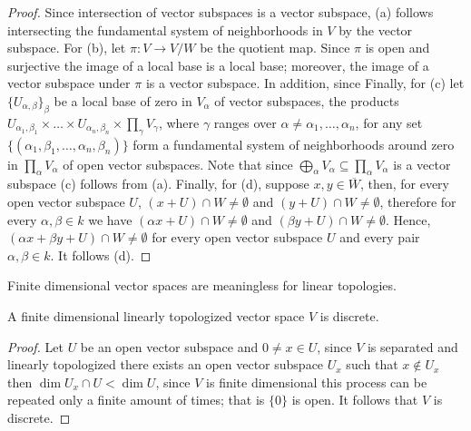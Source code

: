 \begin{proof}
	Since intersection of vector subspaces is a vector subspace, (a) follows intersecting the fundamental system of neighborhoods in $V$ by the vector subspace. For (b), let $\pi\colon V \to V/W$ be the quotient map. Since $\pi$ is open and surjective the image of a local base is a local base; moreover, the image of a vector subspace under $\pi$ is a vector subspace. In addition, since  Finally, for (c) let $\{U_{\alpha, \beta}\}_{\beta}$ be a local base of zero in $V_{\alpha}$ of vector subspaces, the products $U_{\alpha_{1}, \beta_{1}} \times \ldots \times U_{\alpha_{n}, \beta_{n}} \times \prod_{\gamma} V_{\gamma}$, where $\gamma$ ranges over $\alpha \neq \alpha_{1}, \ldots, \alpha_{n}$, for any set $\{(\alpha_{1}, \beta_{1}, \ldots, \alpha_{n}, \beta_{n})\}$ form a fundamental system of neighborhoods around zero in $\prod_{\alpha} V_{\alpha}$ of open vector subspaces. Note that since $\bigoplus_{\alpha} V_{\alpha} \subseteq \prod_{\alpha} V_{\alpha}$ is a vector subspace (c) follows from (a). Finally, for (d), suppose $x,y\in \overline{W}$, then, for every open vector subspace $U$, $(x + U)\cap W \neq \emptyset$ and $(y + U)\cap W \neq \emptyset$, therefore for every $\alpha, \beta \in k$ we have $(\alpha x + U)\cap W \neq \emptyset$ and $(\beta y + U)\cap W \neq \emptyset$. Hence, $(\alpha x + \beta y + U)\cap W\neq \emptyset$ for every open vector subspace $U$ and every pair $\alpha, \beta\in k$. It follows (d).
\end{proof}
Finite dimensional vector spaces are meaningless for linear topologies. 
\begin{proposition}\label{finite_dimensional_linear_topologies}
	A finite dimensional linearly topologized vector space $V$ is discrete.
\end{proposition}
\begin{proof}
	Let $U$ be an open vector subspace and $0 \neq x \in U$, since $V$ is separated and linearly topologized there exists an open vector subspace $U_{x}$ such that $x \not\in U_{x}$ then $\dim U_{x} \cap U < \dim U$, since $V$ is finite dimensional this process can be repeated only a finite amount of times; that is $\{0\}$ is open. It follows that $V$ is discrete.
\end{proof}
